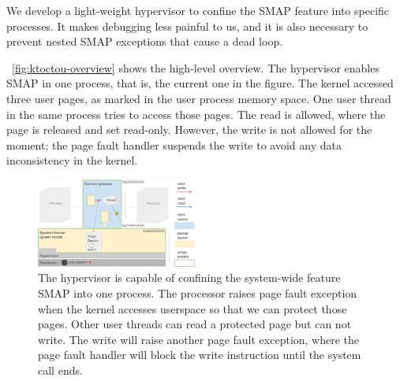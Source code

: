 We develop a light-weight hypervisor to confine the SMAP feature into specific processes. It makes debugging less painful to us, and it is also necessary to prevent nested SMAP exceptions that cause a dead loop.

~\autoref{fig:ktoctou-overview} shows the high-level overview. The hypervisor enables SMAP in one process, that is, the current one in the figure. The kernel accessed three user pages, as marked in the user process memory space. One user thread in the same process tries to access those pages. The read is allowed, where the page is released and set read-only. However, the write is not allowed for the moment; the page fault handler suspends the write to avoid any data inconsistency in the kernel.


\begin{figure}[th]
  \includegraphics[width=0.47\textwidth]{figures/ktoctou-overview}
  \centering
  \caption{The hypervisor is capable of confining the system-wide feature SMAP into one process. The processor raises page fault exception when the kernel accesses userspace so that we can protect those pages. Other user threads can read a protected page but can not write. The write will raise another page fault exception, where the page fault handler will block the write instruction until the system call ends.}
  \label{fig:ktoctou-overview}
\end{figure}
